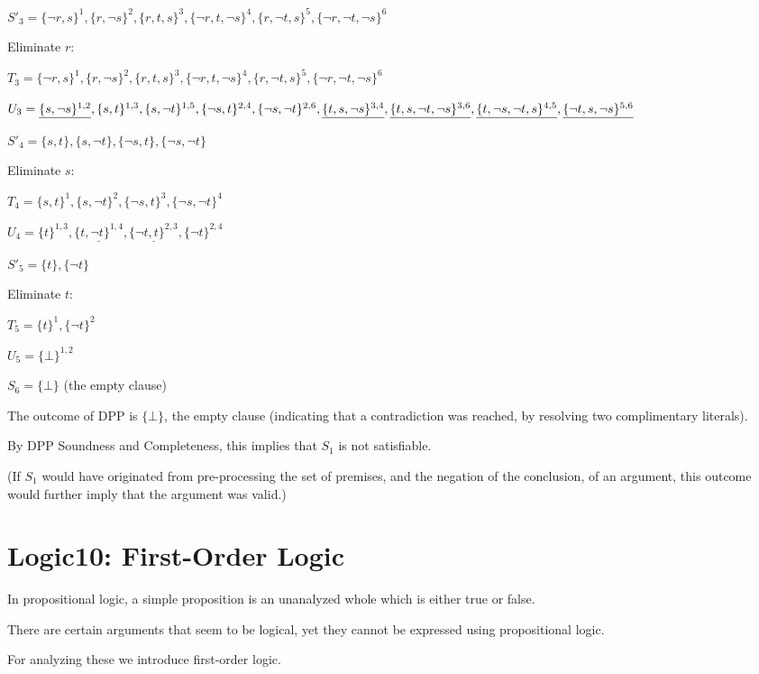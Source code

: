 \documentclass{article}
\begin{document}
$S'_3 = \{\neg r, s\}^1, \{r, \neg s\}^2, \{r,t,s\}^3, \{\neg r, t, \neg s\}^4, \{r, \neg t, s\}^5, \{\neg r, \neg t, \neg s\}^6$

Eliminate $r$:

$T_3 = \{\neg r, s\}^1, \{r, \neg s\}^2, \{r, t, s\}^3, \{\neg r, t, \neg s\}^4, \{r, \neg t, s\}^5, \{\neg r, \neg t, \neg s\}^6$

$U_3 = \underline{\{s, \neg s\}^{1,2}}, \{s, t\}^{1,3}, \{s, \neg t\}^{1,5}, \{\neg s, t\}^{2,4}, \{\neg s, \neg t\}^{2,6}, \underline{\{t, s, \neg s\}^{3,4}}, \underline{\{t, s, \neg t, \neg s\}^{3,6}}, \\ \underline{\{t, \neg s, \neg t, s\}^{4,5}},
\underline{\{\neg t, s, \neg s\}^{5,6}}$

$S'_4 = \{s,t\}, \{s,\neg t\}, \{\neg s, t\}, \{\neg s, \neg t\}$

Eliminate $s$:

$T_4 = \{s,t\}^1, \{s, \neg t\}^2, \{\neg s, t\}^3, \{\neg s, \neg t\}^4$

$U_4 = \{t\}^{1,3}, \underline{\{t, \neg t\}^{1,4}}, \underline{\{\neg t, t\}^{2,3}}, \{\neg t\}^{2,4}$

$S'_5 = \{t\}, \{\neg t\}$

Eliminate $t$:

$T_5 = \{t\}^1, \{\neg t\}^2$

$U_5 = \{\bot\}^{1,2}$

$S_6 = \{\bot\}$ (the empty clause)

The outcome of DPP is $\{\bot\}$, the empty clause (indicating that a contradiction was reached, by resolving two complimentary literals).

By DPP Soundness and Completeness, this implies that $S_1$ is not satisfiable.

(If $S_1$ would have originated from pre-processing the set of premises, and the negation of the conclusion, of an argument, this outcome would further imply that the argument was valid.)

\section{Logic10: First-Order Logic}

In propositional logic, a simple proposition is an unanalyzed whole which is either true or false.

There are certain arguments that seem to be logical, yet they cannot be expressed using propositional logic.

For analyzing these we introduce first-order logic.
\end{document}
